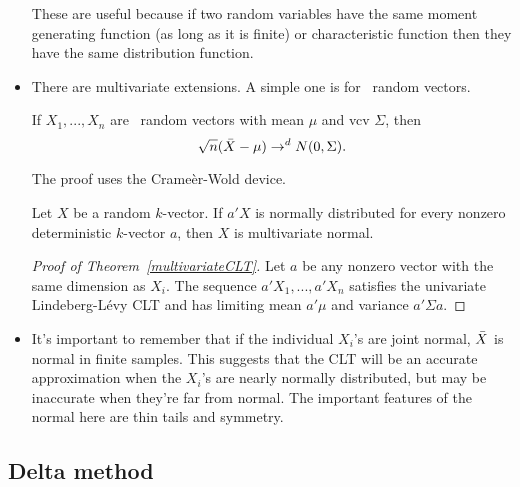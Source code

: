 \begin{itemize}[leftmargin=0pt]
  These are useful because if two random variables have the same
  moment generating function (as long as it is finite) or
  characteristic function then they have the same distribution
  function.

\item There are multivariate extensions.  A simple one is for \iid\
  random vectors.
  \begin{thm}\label{multivariateCLT}
    If $X_1,...,X_n$ are \iid\ random vectors with mean $\mu$ and vcv $\Sigma$,
    then
    \begin{equation*}
      \sqrt{n}(\bar{X} - \mu) \to^d N(0,\Sigma).
    \end{equation*}
  \end{thm}

  The proof uses the Crame\`er-Wold device.
  \begin{thm}
    Let $X$ be a random $k$-vector.  If $a'X$ is normally distributed
    for every nonzero deterministic $k$-vector $a$, then $X$ is
    multivariate normal.
  \end{thm}

  \begin{proof}[Proof of Theorem~\ref{multivariateCLT}]
    Let $a$ be any nonzero vector with the same dimension as $X_i$.
    The sequence $a'X_1,...,a'X_n$ satisfies the univariate
    Lindeberg-L\'evy CLT and has limiting mean $a'\mu$ and variance
    $a'\Sigma a$.
\end{proof}

\item It's important to remember that if the individual $X_i$'s are
  joint normal, $\bar{X}$ is normal in finite samples.  This suggests that
  the CLT will be an accurate approximation when the $X_i$'s are
  nearly normally distributed, but may be inaccurate when they're far
  from normal.  The important features of the normal here are thin
  tails and symmetry.

\end{itemize}

\subsection{Delta method}

